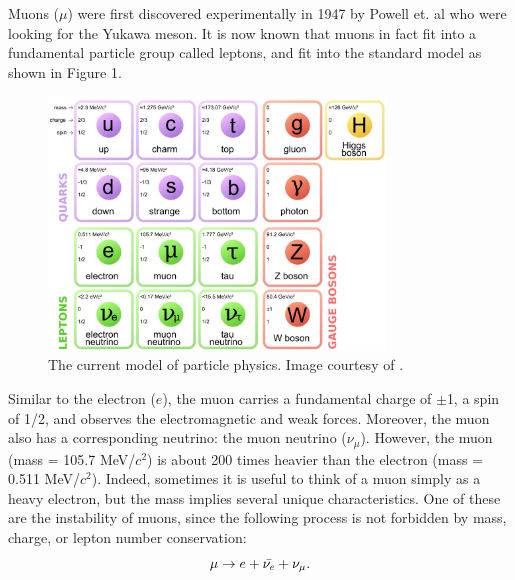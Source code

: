  \par
Muons ($\mu$) were first discovered experimentally in 1947 by Powell et. al \cite{griffithspp} who were looking for the Yukawa meson.
It is now known that muons in fact fit into a fundamental particle group called leptons, and fit into the standard model as shown in Figure 1.

\begin{figure}[h!]
\label{fig:standardmodel}
\centering
\includegraphics[width=0.8\textwidth]{Figures/standardmodel.jpg} 
 \caption{The current model of particle physics. Image courtesy of \cite{quantumdiaries}.}
\end{figure}

Similar to the electron ($e$), the muon carries a fundamental charge of $\pm$1, a spin of 1/2, and observes the electromagnetic and weak forces. Moreover, the muon also has a corresponding neutrino: the muon neutrino ($\nu_\mu$). However, the muon (mass = 105.7 MeV/$c^2$) is about 200 times heavier than the electron (mass = 0.511 MeV/$c^2$). Indeed, sometimes it is useful to think of a muon simply as a heavy electron, but the mass implies several unique characteristics. One of these are the instability of muons, since the following process is not forbidden by mass, charge, or lepton number conservation:
\begin{equation} \nonumber
\mu \rightarrow e+\bar{\nu_e}+\nu_\mu.\\
\end{equation}

